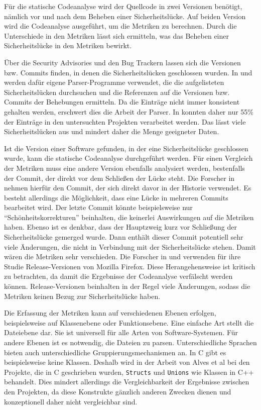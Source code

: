 Für die statische Codeanalyse wird der Quellcode in zwei Versionen benötigt, nämlich vor und nach dem Beheben einer Sicherheitslücke.
Auf beiden Version wird die Codeanalyse ausgeführt, um die Metriken zu berechnen.
Durch die Unterschiede in den Metriken lässt sich ermitteln, was das Beheben einer Sicherheitslücke in den Metriken bewirkt.

Über die Security Advisories und den Bug Trackern lassen sich die Versionen bzw. Commits finden, in denen die Sicherheitslücken geschlossen wurden.
In \cite{alves_et_al} und \cite{chowdhury_zulkernine_2009} werden dafür eigene Parser-Programme verwendet, die die aufgelisteten Sicherheitslücken durchsuchen und die Referenzen auf die Versionen bzw. Commits der Behebungen ermitteln.
Da die Einträge nicht immer konsistent gehalten werden, erschwert dies die Arbeit der Parser.
In \cite{alves_et_al} konnten daher nur 55\% der Einträge in den untersuchten Projekten verarbeitet werden.
Das lässt viele Sicherheitslücken aus und mindert daher die Menge geeigneter Daten.

Ist die Version einer Software gefunden, in der eine Sicherheitslücke geschlossen wurde, kann die statische Codeanalyse durchgeführt werden.
Für einen Vergleich der Metriken muss eine andere Version ebenfalls analysiert werden, bestenfalls der Commit, der direkt vor dem Schließen der Lücke steht.
Die Forscher in \cite{alves_et_al} nehmen hierfür den Commit, der sich direkt davor in der Historie verwendet.
Es besteht allerdings die Möglichkeit, dass eine Lücke in mehreren Commits bearbeitet wird.
Der letzte Commit könnte beispielsweise nur "`Schönheitskorrekturen"' beinhalten, die keinerlei Auswirkungen auf die Metriken haben.
Ebenso ist es denkbar, dass der Hauptzweig kurz vor Schließung der Sicherheitslücke gemerged wurde.
Dann enthält dieser Commit potentiell sehr viele Änderungen, die nicht in Verbindung mit der Sicherheitslücke stehen.
Damit wären die Metriken sehr verschieden.
Die Forscher in \cite{chowdhury_zulkernine_2009} und \cite{chowdhury_zulkernine_2010} verwenden für ihre Studie Release-Versionen von Mozilla Firefox.
Diese Herangehensweise ist kritisch zu betrachten, da damit die Ergebnisse der Codeanalyse verfälscht werden können.
Release-Versionen beinhalten in der Regel viele Änderungen, sodass die Metriken keinen Bezug zur Sicherheitslücke haben.

Die Erfassung der Metriken kann auf verschiedenen Ebenen erfolgen, beispielsweise auf Klassenebene oder Funktionsebene.
Eine einfache Art stellt die Dateiebene dar.
Sie ist universell für alle Arten von Software-Systemen.
Für andere Ebenen ist es notwendig, die Dateien zu parsen.
Unterschiedliche Sprachen bieten auch unterschiedliche Gruppierungsmechanismen an.
In C gibt es beispielsweise keine Klassen.
Deshalb wird in der Arbeit von Alves et al bei den Projekte, die in C geschrieben wurden, \texttt{Structs} und \texttt{Unions} wie Klassen in C++ behandelt.
Dies mindert allerdings die Vergleichbarkeit der Ergebnisse zwischen den Projekten, da diese Konstrukte gänzlich anderen Zwecken dienen und konzeptionell daher nicht vergleichbar sind.

